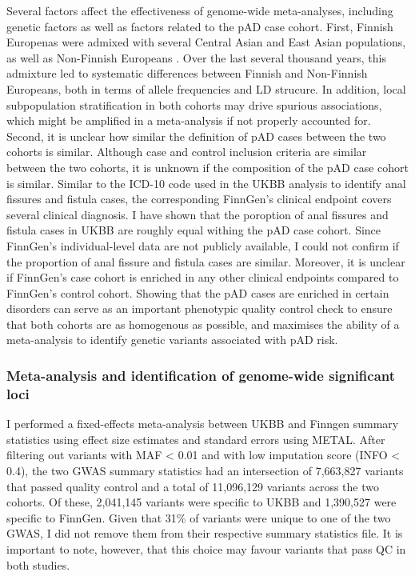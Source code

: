     Several factors affect the effectiveness of genome-wide meta-analyses, including genetic factors as well as factors related to the pAD case cohort. First, Finnish Europenas were admixed with several Central Asian and East Asian populations, as well as Non-Finnish Europeans \cite{Qin2015-jb}. Over the last several thousand years, this admixture led to systematic differences between Finnish and Non-Finnish Europeans, both in terms of allele frequencies and LD strucure.  In addition, local subpopulation stratification in both cohorts may drive spurious associations, which might be amplified in a meta-analysis if not properly accounted for. Second, it is unclear how similar the definition of pAD cases between the two cohorts is similar. Although case and control inclusion criteria are similar between the two cohorts, it is unknown if the composition of the pAD case cohort is similar. Similar to the ICD-10 code used in the UKBB analysis to identify anal fissures and fistula cases, the corresponding FinnGen's clinical endpoint covers several clinical diagnosis. I have shown that the poroption of anal fissures and fistula cases in UKBB are roughly equal withing the pAD case cohort. Since FinnGen's individual-level data are not publicly available, I could not confirm if the proportion of anal fissure and fistula cases are similar. Moreover, it is unclear if FinnGen's case cohort is enriched in any other clinical endpoints compared to FinnGen's control cohort. Showing that the pAD cases are enriched in certain disorders can serve as an important phenotypic quality control check to ensure that both cohorts are as homogenous as possible, and maximises the ability of a meta-analysis to identify genetic variants associated with pAD risk.

    \subsubsection{Meta-analysis and identification of genome-wide significant loci}
    I performed a fixed-effects meta-analysis between UKBB and Finngen summary statistics using effect size estimates and standard errors using METAL. After filtering out variants with MAF < 0.01 and with low imputation score (INFO < 0.4), the two GWAS summary statistics had an intersection of 7,663,827 variants that passed quality control and a total of 11,096,129 variants across the two cohorts. Of these, 2,041,145 variants were specific to UKBB and 1,390,527 were specific to FinnGen. Given that 31\% of variants were unique to one of the two GWAS, I did not remove them from their respective summary statistics file. It is important to note, however, that this choice may favour variants that pass QC in both studies. \\


